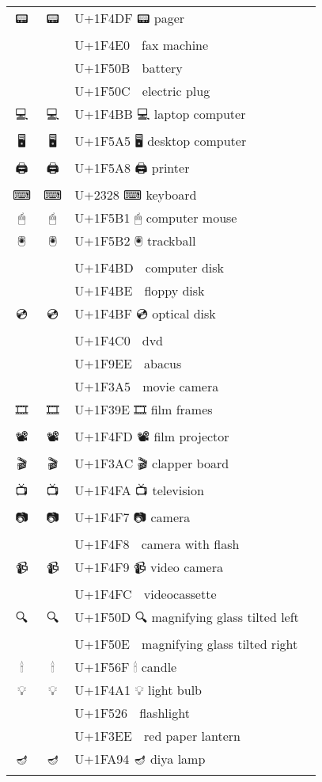 \documentclass[a4paper,12pt]{ltjarticle}
\newcommand{\fontA}[1]{{\fontspec[RawFeature={mode=harf,+dist,+ccmp}]{Segoe UI Emoji} #1}}
\newcommand{\fontB}[1]{{\fontspec[RawFeature={mode=harf,+dist,+ccmp}]{Noto Color Emoji} #1}}
\begin{document}
\begin{longtable}[c]{ccp{0.8\linewidth}}
\fontA{📟}&\fontB{📟}&U+1F4DF 📟 pager\\
\fontA{📠}&\fontB{📠}&U+1F4E0 📠 fax machine\\
\fontA{🔋}&\fontB{🔋}&U+1F50B 🔋 battery\\
\fontA{🔌}&\fontB{🔌}&U+1F50C 🔌 electric plug\\
\fontA{💻}&\fontB{💻}&U+1F4BB 💻 laptop computer\\
\fontA{🖥}&\fontB{🖥}&U+1F5A5 🖥 desktop computer\\
\fontA{🖨}&\fontB{🖨}&U+1F5A8 🖨 printer\\
\fontA{⌨}&\fontB{⌨}&U+2328 ⌨ keyboard\\
\fontA{🖱}&\fontB{🖱}&U+1F5B1 🖱 computer mouse\\
\fontA{🖲}&\fontB{🖲}&U+1F5B2 🖲 trackball\\
\fontA{💽}&\fontB{💽}&U+1F4BD 💽 computer disk\\
\fontA{💾}&\fontB{💾}&U+1F4BE 💾 floppy disk\\
\fontA{💿}&\fontB{💿}&U+1F4BF 💿 optical disk\\
\fontA{📀}&\fontB{📀}&U+1F4C0 📀 dvd\\
\fontA{🧮}&\fontB{🧮}&U+1F9EE 🧮 abacus\\
\fontA{🎥}&\fontB{🎥}&U+1F3A5 🎥 movie camera\\
\fontA{🎞}&\fontB{🎞}&U+1F39E 🎞 film frames\\
\fontA{📽}&\fontB{📽}&U+1F4FD 📽 film projector\\
\fontA{🎬}&\fontB{🎬}&U+1F3AC 🎬 clapper board\\
\fontA{📺}&\fontB{📺}&U+1F4FA 📺 television\\
\fontA{📷}&\fontB{📷}&U+1F4F7 📷 camera\\
\fontA{📸}&\fontB{📸}&U+1F4F8 📸 camera with flash\\
\fontA{📹}&\fontB{📹}&U+1F4F9 📹 video camera\\
\fontA{📼}&\fontB{📼}&U+1F4FC 📼 videocassette\\
\fontA{🔍}&\fontB{🔍}&U+1F50D 🔍 magnifying glass tilted left\\
\fontA{🔎}&\fontB{🔎}&U+1F50E 🔎 magnifying glass tilted right\\
\fontA{🕯}&\fontB{🕯}&U+1F56F 🕯 candle\\
\fontA{💡}&\fontB{💡}&U+1F4A1 💡 light bulb\\
\fontA{🔦}&\fontB{🔦}&U+1F526 🔦 flashlight\\
\fontA{🏮}&\fontB{🏮}&U+1F3EE 🏮 red paper lantern\\
\fontA{🪔}&\fontB{🪔}&U+1FA94 🪔 diya lamp\\

\end{longtable}
\end{document}
